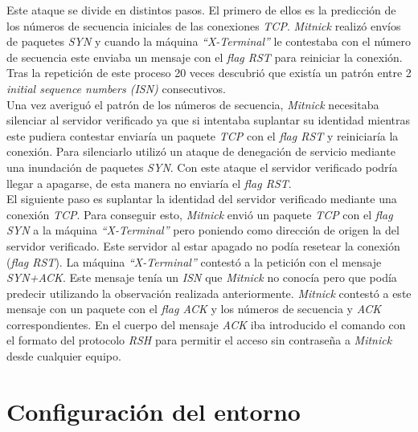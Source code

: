 \documentclass{article}
\begin{document}
Este ataque se divide en distintos pasos. El primero de ellos es la predicción de los números de secuencia iniciales de las conexiones \textit{TCP}. \textit{Mitnick} realizó envíos de paquetes \textit{SYN} y cuando la máquina \textit{``X-Terminal''} le contestaba con el número de secuencia este enviaba un mensaje con el \textit{flag RST} para reiniciar la conexión. Tras la repetición de este proceso 20 veces descubrió que existía un patrón entre 2 \textit{initial sequence numbers (ISN)} consecutivos.\\
Una vez averiguó el patrón de los números de secuencia, \textit{Mitnick} necesitaba silenciar al servidor verificado ya que si intentaba suplantar su identidad mientras este pudiera contestar enviaría un paquete \textit{TCP} con el \textit{flag RST} y reiniciaría la conexión. Para silenciarlo utilizó un ataque de denegación de servicio mediante una inundación de paquetes \textit{SYN}. Con este ataque el servidor verificado podría llegar a apagarse, de esta manera no enviaría el \textit{flag RST}.\\
El siguiente paso es suplantar la identidad del servidor verificado mediante una conexión \textit{TCP}. Para conseguir esto, \textit{Mitnick} envió un paquete \textit{TCP} con el \textit{flag SYN} a la máquina \textit{``X-Terminal''} pero poniendo como dirección de origen la del servidor verificado. Este servidor al estar apagado no podía resetear la conexión (\textit{flag RST}). La máquina \textit{``X-Terminal''} contestó a la petición con el mensaje \textit{SYN+ACK}. Este mensaje tenía un \textit{ISN} que \textit{Mitnick} no conocía pero que podía predecir utilizando la observación realizada anteriormente. \textit{Mitnick} contestó a este mensaje con un paquete con el \textit{flag ACK} y los números de secuencia y \textit{ACK} correspondientes. En el cuerpo del mensaje \textit{ACK} iba introducido el comando con el formato del protocolo \textit{RSH} para permitir el acceso sin contraseña a \textit{Mitnick} desde cualquier equipo.\\


\section{Configuración del entorno}
\end{document}
